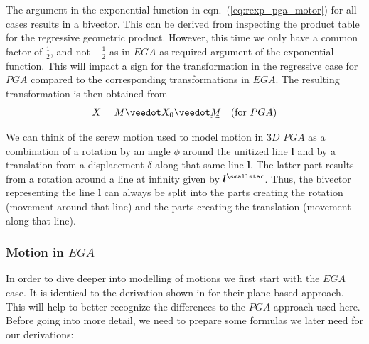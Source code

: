 The argument in the exponential function in eqn.~(\ref{eq:rexp_pga_motor}) for all cases
results in a bivector. This can be derived from inspecting the product table for the
regressive geometric product. However, this time we only have a common factor of
$\frac{1}{2}$, and not $-\frac{1}{2}$ as in $EGA$ as required argument of the exponential
function. This will impact a sign for the transformation in the regressive case for $PGA$
compared to the corresponding transformations in $EGA$.  The resulting transformation is
then obtained from
\begin{equation}
    X = M \veedot X_0 \veedot \rrev{M} \quad (\text{for $PGA$})
    \label{eq:pga_sandwich_tranformation}
\end{equation} 

We can think of the screw motion used to model motion in $3D$ $PGA$ as a combination of a
rotation by an angle $\phi$ around the unitized line $\bm{l}$ and by a translation from a
displacement $\delta$ along that same line $\bm{l}$. The latter part results from a
rotation around a line at infinity given by $\rightweightdual{\bm{l}}$. Thus, the bivector
representing the line $\bm{l}$ can always be split into the parts creating the rotation
(movement around that line) and the parts creating the translation (movement along that
line).\\


\newpage

\subsubsection{Motion in $EGA$}
\label{subsection:motion_EGA}

In order to dive deeper into modelling of motions we first start with the $EGA$ case. It
is identical to the derivation shown in
\cite{Dynamics_in_PGA_plane-based_Dorst-DeKennik:2023} for their plane-based approach.
This will help to better recognize the differences to the $PGA$ approach used here. \\

Before going into more detail, we need to prepare some formulas we later need for our
derivations: \\

